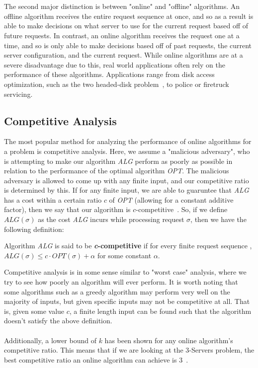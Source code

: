 \\ \\
The second major distinction is between "online" and "offline" algorithms. An offline algorithm receives the entire request sequence at once, and so as a result is able to make decisions on what server to use for the current request based off of future requests. In contrast, an online algorithm receives the request one at a time, and so is only able to make decisions based off of past requests, the current server configuration, and the current request. While online algorithms are at a severe disadvantage due to this, real world applications often rely on the performance of these algorithms. Applications range from disk access optimization, such as the two headed-disk problem~\cite{OnlineComp1998}, to police or firetruck servicing.

\subsection{Competitive Analysis}
\label{sec:compAna}
The most popular method for analyzing the performance of online algorithms for a problem is competitive analysis. Here, we assume a "malicious adversary", who is attempting to make our algorithm \textit{ALG} perform as poorly as possible in relation to the performance of the optimal algorithm \textit{OPT}. The malicious adversary is allowed to come up with any finite input, and our competitive ratio is determined by this. If for any finite input, we are able to guaruntee that \textit{ALG} has a cost within a certain ratio $c$ of \textit{OPT} (allowing for a constant additive factor), then we say that our algorithm is $c$-competitive~\cite{OnlineComp1998}. So, if we define $ALG(\sigma)$ as the cost \textit{ALG} incurs while processing request $\sigma$, then we have the following definition: 

\begin{definition}
\label{def:comp}
Algorithm \textit{ALG} is said to be \textbf{\textit{c}-competitive} if for every finite request sequence \s, $ALG(\sigma) \leq c\cdot OPT(\sigma)+\alpha$ for some constant $\alpha$.
\end{definition}

Competitive analysis is in some sense similar to "worst case" analysis, where we try to see how poorly an algorithm will ever perform. It is worth noting that some algorithms such as a greedy algorithm may perform very well on the majority of inputs, but given specific inputs may not be competitive at all. That is, given some value $c$, a finite length input can be found such that the algorithm doesn't satisfy the above definition. 
\\ \\
Additionally, a lower bound of $k$ has been shown for any online algorithm's competitive ratio. This means that if we are looking at the 3-Servers problem, the best competitive ratio an online algorithm can achieve is 3~\cite{OnlineComp1998}.